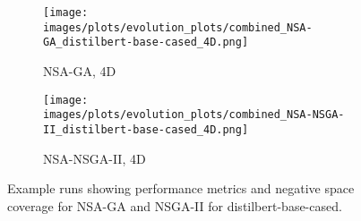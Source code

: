 \begin{figure}[htbp]
    \vspace{0.2cm}
    \begin{subfigure}[b]{0.40\textwidth}
        \texttt{[image: images/plots/evolution\_plots/combined\_NSA-GA\_distilbert-base-cased\_4D.png]}
        \caption{\scriptsize NSA-GA, 4D}
        \label{subfig:distilbert-base-cased_NSA-GA_4D}
        \end{subfigure}\hspace{0.05\textwidth}
    \begin{subfigure}[b]{0.40\textwidth}
        \texttt{[image: images/plots/evolution\_plots/combined\_NSA-NSGA-II\_distilbert-base-cased\_4D.png]}
        \caption{\scriptsize NSA-NSGA-II, 4D}
        \label{subfig:distilbert-base-cased_NSA-NSGA-II_4D}
        \end{subfigure}
    \caption{\small Example runs showing performance metrics and negative space coverage for NSA-GA and NSGA-II for distilbert-base-cased.}
        \label{fig:evolution_plots_distilbert-base-cased}
        \end{figure}
        
